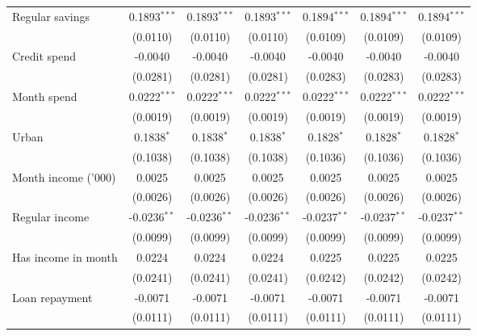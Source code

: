 \begin{table}[htbp]
\begin{footnotesize}
\begin{tabular}{lcccccc}
         Regular savings     & 0.1893$^{***}$ & 0.1893$^{***}$ & 0.1893$^{***}$ & 0.1894$^{***}$ & 0.1894$^{***}$ & 0.1894$^{***}$\\
                             & (0.0110)       & (0.0110)       & (0.0110)       & (0.0109)       & (0.0109)       & (0.0109)\\
         Credit spend        & -0.0040        & -0.0040        & -0.0040        & -0.0040        & -0.0040        & -0.0040\\
                             & (0.0281)       & (0.0281)       & (0.0281)       & (0.0283)       & (0.0283)       & (0.0283)\\
         Month spend         & 0.0222$^{***}$ & 0.0222$^{***}$ & 0.0222$^{***}$ & 0.0222$^{***}$ & 0.0222$^{***}$ & 0.0222$^{***}$\\
                             & (0.0019)       & (0.0019)       & (0.0019)       & (0.0019)       & (0.0019)       & (0.0019)\\
         Urban               & 0.1838$^{*}$   & 0.1838$^{*}$   & 0.1838$^{*}$   & 0.1828$^{*}$   & 0.1828$^{*}$   & 0.1828$^{*}$\\
                             & (0.1038)       & (0.1038)       & (0.1038)       & (0.1036)       & (0.1036)       & (0.1036)\\
         Month income ('000) & 0.0025         & 0.0025         & 0.0025         & 0.0025         & 0.0025         & 0.0025\\
                             & (0.0026)       & (0.0026)       & (0.0026)       & (0.0026)       & (0.0026)       & (0.0026)\\
         Regular income      & -0.0236$^{**}$ & -0.0236$^{**}$ & -0.0236$^{**}$ & -0.0237$^{**}$ & -0.0237$^{**}$ & -0.0237$^{**}$\\
                             & (0.0099)       & (0.0099)       & (0.0099)       & (0.0099)       & (0.0099)       & (0.0099)\\
         Has income in month & 0.0224         & 0.0224         & 0.0224         & 0.0225         & 0.0225         & 0.0225\\
                             & (0.0241)       & (0.0241)       & (0.0241)       & (0.0242)       & (0.0242)       & (0.0242)\\
         Loan repayment      & -0.0071        & -0.0071        & -0.0071        & -0.0071        & -0.0071        & -0.0071\\
                             & (0.0111)       & (0.0111)       & (0.0111)       & (0.0111)       & (0.0111)       & (0.0111)\\

\end{tabular}
\end{footnotesize}
\end{table}
